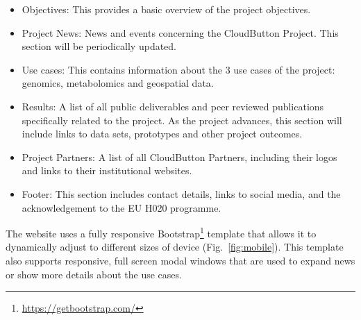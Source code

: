 \documentclass[a4paper,11pt]{article}
\numberwithin{table}{subsection} %
\begin{document}
\begin{itemize}
\item Objectives: This provides a basic overview of the project objectives.
\item Project News: News and events concerning the CloudButton Project. This section will be periodically updated.
\item Use cases: This contains information about the 3 use cases of the project: genomics, metabolomics and geospatial data.
\item Results: A list of all public deliverables and peer reviewed publications specifically related to the project. As the project advances, this section will include links to data sets, prototypes and other project outcomes.
\item Project Partners: A list of all CloudButton Partners, including their logos and links to their institutional websites.
\item Footer: This section includes contact details, links to social media, and the acknowledgement to the EU H020 programme.
\end{itemize}

The website uses a fully responsive Bootstrap\footnote{\url{https://getbootstrap.com/}}  template that allows it to  dynamically adjust to different sizes of device (Fig.~\ref{fig:mobile}). This template also supports responsive, full screen modal windows that are used to expand news or show more details about the use cases.
\end{document}
